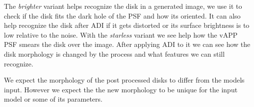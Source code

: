 The \textit{brighter} variant helps recognize the disk in a generated image, we use it to check if the disk fits the dark hole of the \ac{PSF} and how its oriented. It can also help recognize the disk after \ac{ADI} if it gets distorted or its surface brightness is to low relative to the noise. With the \textit{starless} variant we see help how the \ac{vAPP} \ac{PSF} smears the disk over the image. After applying \ac{ADI} to it we can see how the disk morphology is changed by the process and what features we can still recognize.

We expect the morphology of the post processed disks to differ from the models input. However we expect the the new morphology to be unique for the input model or some of its parameters.


